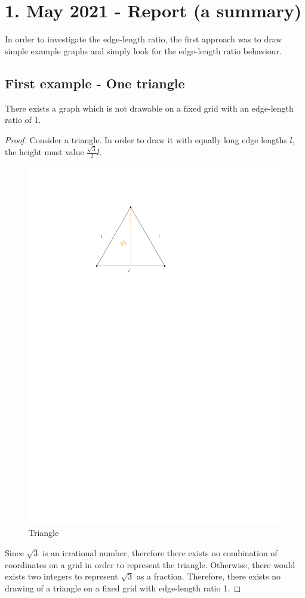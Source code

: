 \section{1. May 2021 - Report (a summary)}
In order to investigate the edge-length ratio, the first approach was to draw simple example graphs and simply look for the edge-length ratio behaviour.
\subsection{First example - One triangle}
\begin{lemma}
	There exists a graph which is not drawable on a fixed grid with an edge-length ratio of 1.
\end{lemma}
\begin{proof}
	Consider a triangle. In order to draw it with equally long edge lengths $l$, the height must value $\frac{\sqrt{3}}{2}l$.
		\begin{figure}[H]
		\centering
		\includegraphics[page=1]{drawings/previous-results.pdf}
		\caption{Triangle}
	\end{figure}
	Since $\sqrt{3}$ is an irrational number, therefore there exists no combination of coordinates on a grid in order to represent the triangle. Otherwise, there would exists two integers to represent $\sqrt{3}$ as a fraction. Therefore, there exists no drawing of a triangle on a fixed grid with edge-length ratio 1.
\end{proof}
